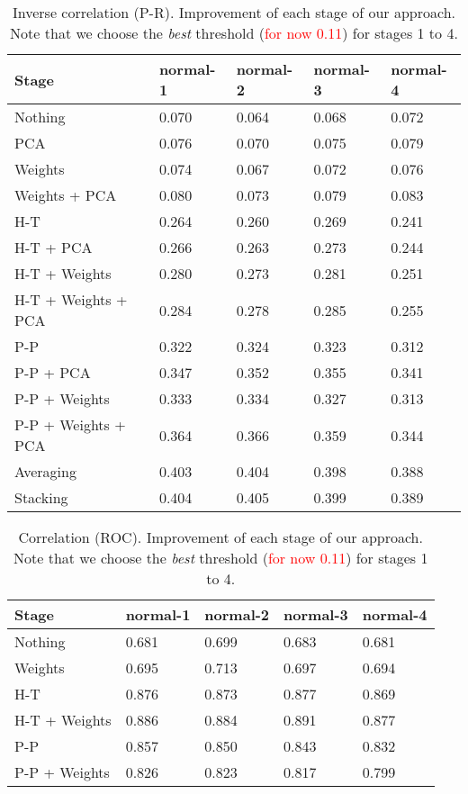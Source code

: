 \documentclass[wcp]{jmlr}
\begin{document}
\begin{table}[H]
\centering
\caption{Inverse correlation (P-R). Improvement of each stage of our approach. Note that we choose the
         \textit{best} threshold (\textcolor{red}{for now 0.11}) for stages 1 to 4.}
\begin{tabular}{*{5}{l}}
\toprule
Stage               & normal-1 & normal-2 & normal-3 & normal-4 \\
\midrule
Nothing             & 0.070 & 0.064 & 0.068 & 0.072\\
PCA                 & 0.076 & 0.070 & 0.075 & 0.079\\
Weights             & 0.074 & 0.067 & 0.072 & 0.076\\
Weights + PCA       & 0.080 & 0.073 & 0.079 & 0.083\\
H-T                 & 0.264 & 0.260 & 0.269 & 0.241\\
H-T + PCA           & 0.266 & 0.263 & 0.273 & 0.244\\
H-T + Weights       & 0.280 & 0.273 & 0.281 & 0.251\\
H-T + Weights + PCA & 0.284 & 0.278 & 0.285 & 0.255\\
P-P                 & 0.322 & 0.324 & 0.323 & 0.312\\
P-P + PCA           & 0.347 & 0.352 & 0.355 & 0.341\\
P-P + Weights       & 0.333 & 0.334 & 0.327 & 0.313\\
P-P + Weights + PCA & 0.364 & 0.366 & 0.359 & 0.344\\
Averaging           & 0.403 & 0.404 & 0.398 & 0.388\\
Stacking            & 0.404 & 0.405 & 0.399 & 0.389\\
\bottomrule
\end{tabular}
\end{table}


\begin{table}[H]
\centering
\caption{Correlation (ROC). Improvement of each stage of our approach. Note that we choose the
         \textit{best} threshold (\textcolor{red}{for now 0.11}) for stages 1 to 4.}
\begin{tabular}{*{5}{l}}
\toprule
Stage               & normal-1 & normal-2 & normal-3 & normal-4 \\
\midrule
Nothing             & 0.681 & 0.699 & 0.683 & 0.681\\
Weights             & 0.695 & 0.713 & 0.697 & 0.694\\
H-T                 & 0.876 & 0.873 & 0.877 & 0.869\\
H-T + Weights       & 0.886 & 0.884 & 0.891 & 0.877\\
P-P                 & 0.857 & 0.850 & 0.843 & 0.832\\
P-P + Weights       & 0.826 & 0.823 & 0.817 & 0.799\\
\bottomrule
\end{tabular}
\end{table}
\end{document}
